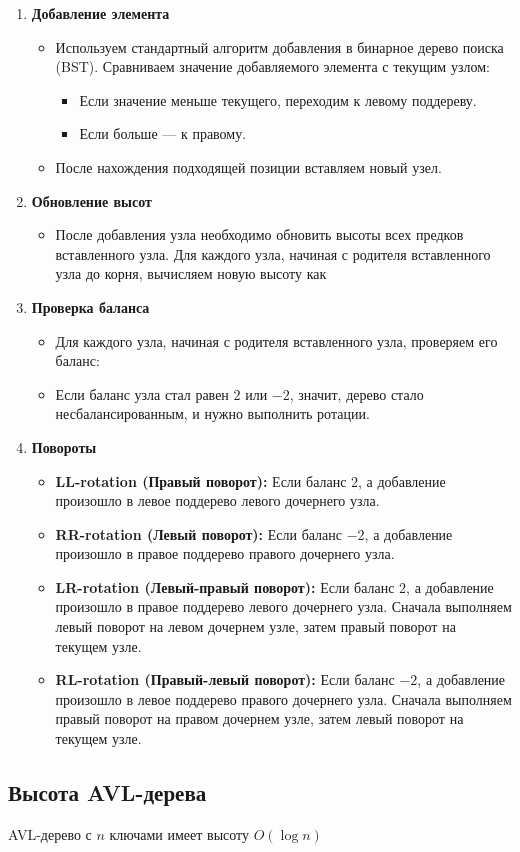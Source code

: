 \documentclass[a4paper]{article}
\begin{document}
\begin{enumerate}
    \item \textbf{Добавление элемента}
    \begin{itemize}
        \item Используем стандартный алгоритм добавления в бинарное дерево поиска (BST). Сравниваем значение добавляемого элемента с текущим узлом:
        \begin{itemize}
            \item Если значение меньше текущего, переходим к левому поддереву.
            \item Если больше — к правому.
        \end{itemize}
        \item После нахождения подходящей позиции вставляем новый узел.
    \end{itemize}

    \item \textbf{Обновление высот}
    \begin{itemize}
        \item После добавления узла необходимо обновить высоты всех предков вставленного узла. Для каждого узла, начиная с родителя вставленного узла до корня, вычисляем новую высоту как 
    \end{itemize}

    \item \textbf{Проверка баланса}
    \begin{itemize}
        \item Для каждого узла, начиная с родителя вставленного узла, проверяем его баланс:
        \item Если баланс узла стал равен $2$ или $-2$, значит, дерево стало несбалансированным, и нужно выполнить ротации.
    \end{itemize}

    \item \textbf{Повороты}
    \begin{itemize}
        \item \textbf{LL-rotation (Правый поворот):} Если баланс $2$, а добавление произошло в левое поддерево левого дочернего узла.
        \item \textbf{RR-rotation (Левый поворот):} Если баланс $-2$, а добавление произошло в правое поддерево правого дочернего узла.
        \item \textbf{LR-rotation (Левый-правый поворот):} Если баланс $2$, а добавление произошло в правое поддерево левого дочернего узла. Сначала выполняем левый поворот на левом дочернем узле, затем правый поворот на текущем узле.
        \item \textbf{RL-rotation (Правый-левый поворот):} Если баланс $-2$, а добавление произошло в левое поддерево правого дочернего узла. Сначала выполняем правый поворот на правом дочернем узле, затем левый поворот на текущем узле.
    \end{itemize}
\end{enumerate}

\subsection{Высота AVL-дерева}
AVL-дерево с $n$ ключами имеет высоту $O(\log n)$
\end{document}
